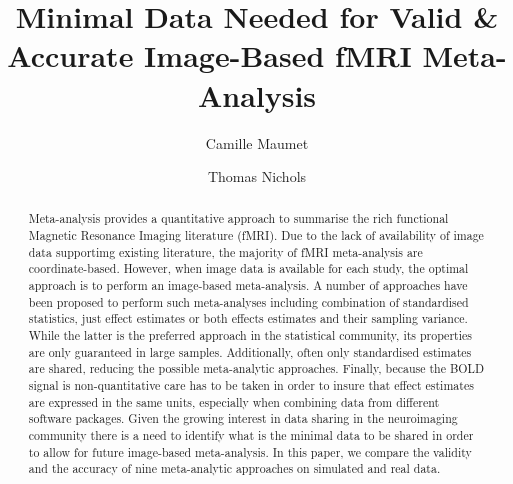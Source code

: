 \documentclass[preprint]{elsarticle}
\begin{document}
\begin{frontmatter}


\title{Minimal Data Needed for Valid \& Accurate Image-Based fMRI Meta-Analysis}




\author{Camille Maumet}
\author{Thomas Nichols}

\address{Oxford Big Data Institute, Li Ka Shing Centre for Health Information and Discovery, Nuffield Department of Population Health, University of Oxford, Oxford, UK}
\address{Statistics Department, University of Warwick, Coventry, UK.}

\begin{abstract}
Meta-analysis provides a quantitative approach to summarise the rich functional Magnetic Resonance Imaging literature (fMRI). Due to the lack of availability of image data supportimg existing literature, the majority of fMRI meta-analysis are coordinate-based. However, when image data is available for each study, the optimal approach is to perform an image-based meta-analysis. A number of approaches have been proposed to perform such meta-analyses including combination of standardised statistics, just effect estimates or both effects estimates and their sampling variance. While the latter is the preferred approach in the statistical community, its properties are only guaranteed in large samples. Additionally, often only standardised estimates are shared, reducing the possible meta-analytic approaches. Finally, because the BOLD signal is non-quantitative care has to be taken in order to insure that effect estimates are expressed in the same units, especially when combining data from different software packages. Given the growing interest in data sharing in the neuroimaging community there is a need to identify what is the minimal data to be shared in order to allow for future image-based meta-analysis. In this paper, we compare the validity and the accuracy of nine meta-analytic approaches on simulated and real data. 


\end{abstract}
\end{frontmatter}
\end{document}
